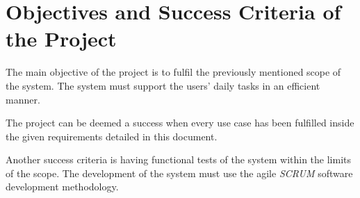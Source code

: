 \section{Objectives and Success Criteria of the Project}
The main objective of the project is to fulfil the previously mentioned scope of the system. 
The system must support the users' daily tasks in an efficient manner. 

The project can be deemed a success when every use case has been fulfilled inside the given requirements detailed in this document.

Another success criteria is having functional tests of the system within the limits of the scope. 
The development of the system must use the agile \textit{SCRUM} software development methodology.